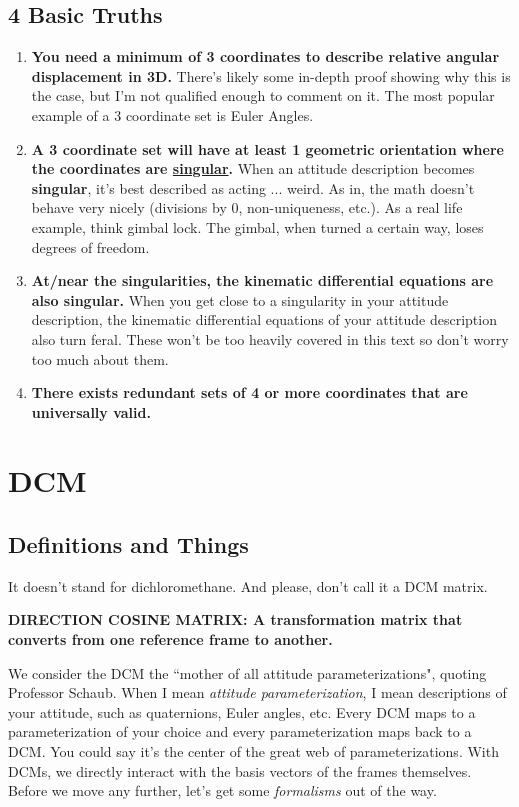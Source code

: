 \documentclass[a4paper,14pt]{extreport}
\begin{document}
\section{4 Basic Truths}
\begin{enumerate}
\item \textbf{You need a minimum of 3 coordinates to describe relative angular displacement in 3D.} There's likely some in-depth proof showing why this is the case, but I'm not qualified enough to comment on it. The most popular example of a 3 coordinate set is Euler Angles.

\item \textbf{A 3 coordinate set will have at least 1 geometric orientation where the coordinates are \underline{singular}.} When an attitude description becomes \textbf{singular}, it's best described as acting ... weird. As in, the math doesn't behave very nicely (divisions by 0, non-uniqueness, etc.). As a real life example, think gimbal lock. The gimbal, when turned a certain way, loses degrees of freedom.

\item \textbf{At/near the singularities, the kinematic differential equations are also singular.} When you get close to a singularity in your attitude description, the kinematic differential equations of your attitude description also turn feral. These won't be too heavily covered in this text so don't worry too much about them.

\item \textbf{There exists redundant sets of 4 or more coordinates that are universally valid.}

\end{enumerate}
\chapter{DCM}
\section{Definitions and Things}
It doesn't stand for dichloromethane. And please, don't call it a DCM matrix.

\begin{center}
\textbf{DIRECTION COSINE MATRIX: A transformation matrix that converts from one reference frame to another.}
\end{center}

We consider the DCM the ``mother of all attitude parameterizations", quoting Professor Schaub. When I mean \emph{attitude parameterization}, I mean descriptions of your attitude, such as quaternions, Euler angles, etc. Every DCM maps to a parameterization of your choice and every parameterization maps back to a DCM. You could say it's the center of the great web of parameterizations. With DCMs, we directly interact with the basis vectors of the frames themselves. Before we move any further, let's get some \emph{formalisms} out of the way.
\end{document}
